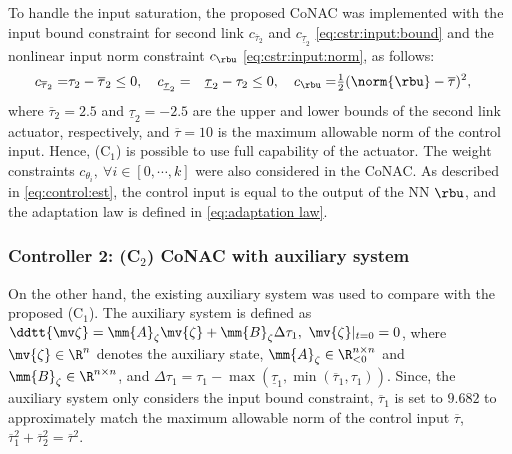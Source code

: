 \documentclass[final,5p,times,twocolumn,authoryear]{elsarticle}
\begin{document}
To handle the input saturation, the proposed CoNAC was implemented with the input bound constraint for second link $c_{\overline\tau_2}$ and $c_{\underline\tau_2}$ \eqref{eq:cstr:input:bound} and the nonlinear input norm constraint $c_{\rbu}$ \eqref{eq:cstr:input:norm}, as follows:
\begin{equation}
    \begin{aligned}
        c_{\overline\tau_2}     
        =&
        \tau_2-\overline\tau_2
        \le 0
        ,
        \quad
        c_{\underline\tau_2} 
        =&
        \underline\tau_2-\tau_2
        \le 0
        ,
        \quad
        c_{\rbu}
        =&
        \tfrac{1}{2}
        (
            \norm{\rbu}-\overline\tau
        )^2 
        ,
    \end{aligned}
    \label{eq:sim:cstr:CoNAC}
\end{equation}
where $\overline\tau_2=2.5$ and $\underline\tau_2=-2.5$ are the upper and lower bounds of the second link actuator, respectively, and $\overline\tau=10$ is the maximum allowable norm of the control input.
Hence, (C$_1$) is possible to use full capability of the actuator.
The weight constraints $c_{\theta_i},\ \forall i\in[0,\cdots,k]$ were also considered in the CoNAC.
As described in \eqref{eq:control:est}, the control input is equal to the output of the NN $\rbu$, and the adaptation law is defined in \eqref{eq:adaptation law}.

\subsubsection*{Controller 2: (C$_2$) CoNAC with auxiliary system}

On the other hand, the existing auxiliary system \cite{Esfandiari:2014aa,Karason:1994aa,Esfandiari:2015aa} was used to compare with the proposed (C$_1$).
The auxiliary system is defined as $\ddtt{\mv\zeta} = \mm{A}_\zeta \mv{\zeta} + \mm{B}_\zeta \Delta\tau_{1},\ \mv{\zeta}\vert_{t=0} = 0$, where $\mv{\zeta}\in\R^n$ denotes the auxiliary state, $\mm{A}_\zeta\in\R_{<0}^{n\times n}$ and $\mm{B}_\zeta\in\R^{n\times n}$, and $\Delta\tau_{1} = 
\tau_{1}-\max(\underline\tau_1,\min(\overline\tau_1,\tau_1))$.
Since, the auxiliary system only considers the input bound constraint, $\overline{\tau}_1$ is set to $9.682$ to approximately match the maximum allowable norm of the control input $\overline\tau$, \ie $\overline{\tau}_1^2+\overline{\tau}_2^2=\overline{\tau}^2$.
\end{document}
